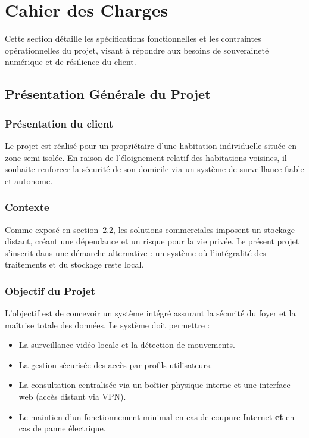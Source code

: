 \documentclass[12pt,a4paper]{article}
\begin{document}
\section{Cahier des Charges}

Cette section détaille les spécifications fonctionnelles et les contraintes opérationnelles du projet, visant à répondre aux besoins de souveraineté numérique et de résilience du client.

\subsection{Présentation Générale du Projet}

\subsubsection{Présentation du client}
Le projet est réalisé pour un propriétaire d'une habitation individuelle située en zone semi-isolée. En raison de l'éloignement relatif des habitations voisines, il souhaite renforcer la sécurité de son domicile via un système de surveillance fiable et autonome.

\subsubsection{Contexte}
Comme exposé en section~2.2, les solutions commerciales imposent un stockage distant, créant une dépendance et un risque pour la vie privée. Le présent projet s'inscrit dans une démarche alternative : un système où l'intégralité des traitements et du stockage reste local.

\subsubsection{Objectif du Projet}
L'objectif est de concevoir un système intégré assurant la sécurité du foyer et la maîtrise totale des données. Le système doit permettre :
\begin{itemize}[label=•]
    \item La surveillance vidéo locale et la détection de mouvements.
    \item La gestion sécurisée des accès par profils utilisateurs.
    \item La consultation centralisée via un boîtier physique interne et une interface web (accès distant via VPN).
    \item Le maintien d'un fonctionnement minimal en cas de coupure Internet \textbf{et} en cas de panne électrique.
\end{itemize}
\end{document}
